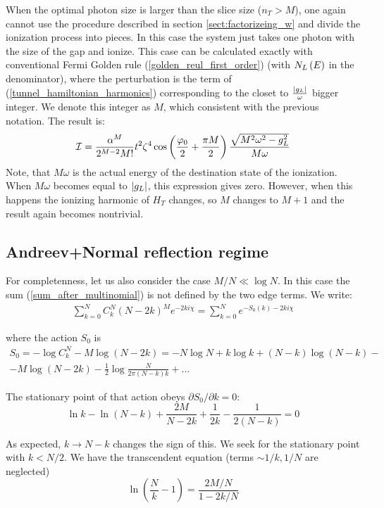 When the optimal photon size is larger than the slice size ($ n_T>M $), one again cannot use the procedure described in section \ref{sect:factorizeing_w} and divide the ionization process into pieces. In this case the system just takes one photon with the size of the gap and ionize. This case can be calculated exactly with conventional Fermi Golden rule (\ref{golden_reul_first_order}) (with $ N_L\left(E\right) $ in the denominator), where the perturbation is the term of (\ref{tunnel_hamiltonian_harmonics}) corresponding to the closet to $ \frac{\left|g_L\right|}{\omega} $ bigger integer. We denote this integer as $ M $, which consistent with the previous notation. The result is:
\begin{gather}
	\mathcal{I}
	=
	\frac
	{\alpha^M}{2^{M-2}M!}
	t^2\zeta^4
	\cos
	\left(
		\frac{\varphi_0}{2}
		+
		\frac{\pi M}{2}
	\right)
	\frac
	{\sqrt{M^2\omega^2-g_L^2}}
	{M\omega}
\end{gather}
Note, that $ M\omega $ is the actual energy of the destination state of the ionization. When $ M\omega $ becomes equal to $ \left|g_L\right| $, this expression gives zero. However, when this happens  the ionizing harmonic of $ H_T $ changes, so $ M $ changes to $ M+1 $ and the result again becomes nontrivial.
\subsection{Andreev+Normal reflection regime}

For completenness, let us also consider the case $M/N\ll\log N$.
In this case the sum (\ref{sum_after_multinomial}) is not defined by the two edge terms.
We write:
\begin{gather}
\sum_{k=0}^{N}C_{k}^{N}(N-2k)^{M}e^{-2ki\chi}=\sum_{k=0}^{N}e^{-S_{0}(k)-2ki\chi}
\end{gather}

where the action $S_{0}$ is 
\begin{multline*}
S_{0}=-\log C_{k}^{N}-M\log(N-2k)=-N\log N+k\log k+(N-k)\log(N-k)-\\
-M\log(N-2k)-\frac{1}{2}\log\frac{N}{2\pi(N-k)k}+\dots
\end{multline*}

The stationary point of that action obeys $\partial S_{0}/\partial k=0$:
\[
\ln k-\ln(N-k)+\frac{2M}{N-2k}+\frac{1}{2k}-\frac{1}{2(N-k)}=0
\]

As expected, $k\to N-k$ changes the sign of this. We seek for the
stationary point with $k<N/2$. We have the transcendent equation
(terms $\sim1/k,1/N$ are neglected)
\[
\ln(\frac{N}{k}-1)=\frac{2M/N}{1-2k/N}
\]

